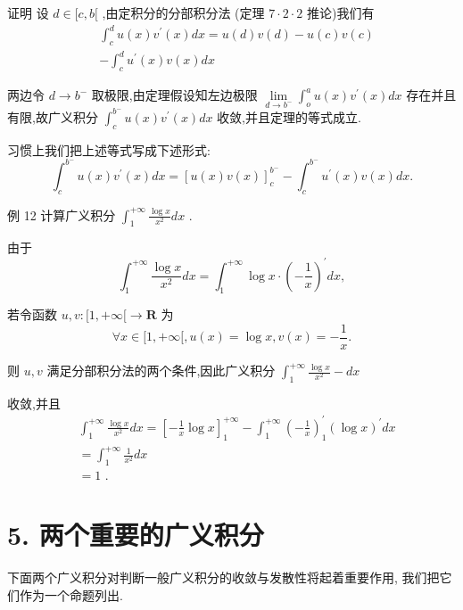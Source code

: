 证明 设 $d \in  \lbrack c,b\lbrack$ ,由定积分的分部积分法 (定理 $7 \cdot  2 \cdot  2$ 推论)我们有
\begin{align*}
	&{\int }_{c}^{d}u\left( x\right) {v}^{\prime }\left( x\right) {dx} = u\left( d\right) v\left( d\right)  - u\left( c\right) v\left( c\right)\\
	&- {\int }_{c}^{d}{u}^{\prime }\left( x\right) v\left( x\right) {dx}
\end{align*}

两边令 $d \rightarrow  {b}^{ - }$ 取极限,由定理假设知左边极限 $\mathop{\lim }\limits_{{d \rightarrow  {b}^{ - }}}{\int }_{o}^{a}u\left( x\right) {v}^{\prime }\left( x\right) {dx}$ 存在并且有限,故广义积分 ${\int }_{c}^{{b}^{ - }}u\left( x\right) {v}^{\prime }\left( x\right) {dx}$ 收敛,并且定理的等式成立.

习惯上我们把上述等式写成下述形式:
$${\int }_{c}^{{b}^{ - }}u\left( x\right) {v}^{\prime }\left( x\right) {dx} = {\left\lbrack  u\left( x\right) v\left( x\right) \right\rbrack  }_{c}^{{b}^{ - }} - {\int }_{c}^{{b}^{ - }}{u}^{\prime }\left( x\right) v\left( x\right) {dx}.$$

例 12 计算广义积分 ${\int }_{1}^{+\infty }\frac{\log x}{{x}^{2}}{dx}$ .

由于
$${\int }_{1}^{+\infty }\frac{\log x}{{x}^{2}}{dx} = {\int }_{1}^{+\infty }\log x \cdot  {\left( -\frac{1}{x}\right) }^{\prime }{dx},$$

若令函数 $u,v : \lbrack 1, + \infty \lbrack  \rightarrow  \mathbf{R}$ 为
$$\forall x \in  \lbrack 1, + \infty \lbrack ,u\left( x\right)  = \log x,v\left( x\right)  =  - \frac{1}{x}.$$

则 $u,v$ 满足分部积分法的两个条件,因此广义积分 ${\int }_{1}^{+\infty }\frac{\log x}{{x}^{2}} - {dx}$

收敛,并且
\begin{align*}
	&{\int }_{1}^{+\infty }\frac{\log x}{{x}^{2}}{dx} = {\left\lbrack  -\frac{1}{x}\log x\right\rbrack  }_{1}^{+\infty } - {\int }_{1}^{+\infty }{\left( -\frac{1}{x}\right) }_{1}^{\prime }{\left( \log x\right) }^{\prime }{dx}\\
	&= {\int }_{1}^{+\infty }\frac{1}{{x}^{2}}{dx}\\
	&= 1\text{ . }
\end{align*}

\section*{5. 两个重要的广义积分}

下面两个广义积分对判断一般广义积分的收敛与发散性将起着重要作用, 我们把它们作为一个命题列出.

